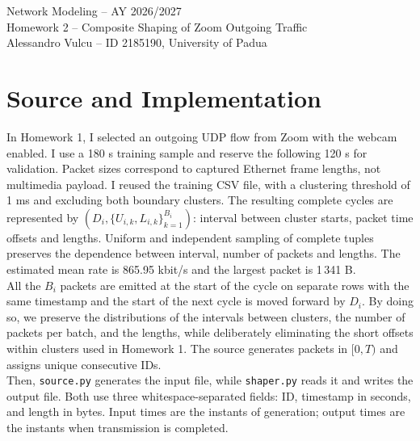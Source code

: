 \documentclass[10pt,a4paper]{article}
\begin{document}
\begin{center}
{\Large Network Modeling -- AY 2026/2027}\\[4pt]
{\large Homework 2 -- Composite Shaping of Zoom Outgoing Traffic}\\[5pt]
Alessandro Vulcu -- ID 2185190, University of Padua
\end{center}
\begin{abstract}
I implemented a token bucket followed by a constant-rate leaky bucket, both operating
in simulated time, using the empirical Zoom traffic source fitted in Homework 1.
A grid search selects rates and buffer capacities under loss and delay constraints.
Independent 30-minute replications confirm the chosen configuration.
The results quantify the shaper’s contribution to QoS for the estimated traffic model,
rather than the overall call quality.
\end{abstract}

\section{Source and Implementation}
In Homework 1, I selected an outgoing UDP flow from Zoom with the webcam enabled.
I use a 180 s training sample and reserve the following 120 s for validation.
Packet sizes correspond to captured Ethernet frame lengths, not multimedia payload.
I reused the training CSV file, with a clustering threshold of 1 ms and excluding
both boundary clusters. The resulting complete cycles are represented by
$(D_i,\{U_{i,k},L_{i,k}\}_{k=1}^{B_i})$: interval between cluster starts, packet
time offsets and lengths. Uniform and independent sampling of complete tuples
preserves the dependence between interval, number of packets and lengths.
The estimated mean rate is 865.95 kbit/s and the largest packet is 1\,341 B.\\

All the $B_i$ packets are emitted at the start of the cycle on separate rows with the same timestamp and the start of the next cycle is moved forward by $D_i$. 
By doing so, we preserve the distributions of the intervals between clusters, the number of packets per batch, and the lengths, while deliberately eliminating the
short offsets within clusters used in Homework 1. The source generates packets in $[0,T)$ and assigns unique consecutive IDs.\\

Then, \texttt{source.py} generates the input file, while \texttt{shaper.py} reads it and writes the output file. Both use three whitespace-separated fields: ID, timestamp in seconds, and length in bytes. Input times are the instants of generation; output times are the instants when transmission is completed.\\
\end{document}
